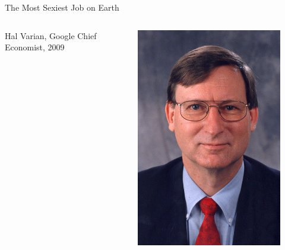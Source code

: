 \documentclass[main.tex]{subfiles}
\begin{document}
\begin{frame}{The Most Sexiest Job on Earth}
\begin{columns}
\begin{column}{.6\textwidth}
\begin{justify}
                    Hal Varian, Google Chief Economist, 2009
                \end{justify}
            \end{column}
            \begin{column}{.4\textwidth}
                \begin{figure}
                    \label{fig:hal-varian}
                    \includegraphics[width=.6\textwidth,cframe=gray]{figures/external/hal-varian.jpg}
                \end{figure}
            \end{column}
        \end{columns}
    \end{frame}
\end{document}

